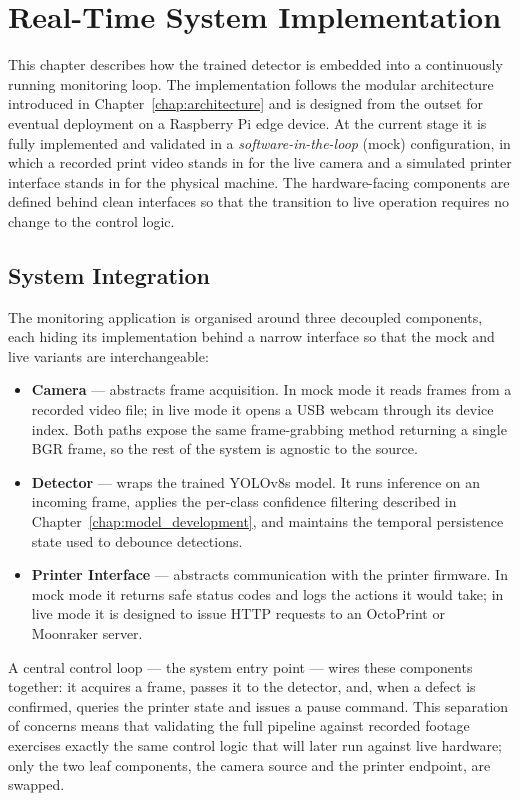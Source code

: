 \documentclass[english, Lau, oneside]{sapthesis}
\begin{document}
\chapter{Real-Time System Implementation}
\label{chap:implementation}

This chapter describes how the trained detector is embedded into a continuously running monitoring loop. The implementation follows the modular architecture introduced in Chapter~\ref{chap:architecture} and is designed from the outset for eventual deployment on a Raspberry Pi edge device. At the current stage it is fully implemented and validated in a \textit{software-in-the-loop} (mock) configuration, in which a recorded print video stands in for the live camera and a simulated printer interface stands in for the physical machine. The hardware-facing components are defined behind clean interfaces so that the transition to live operation requires no change to the control logic.

\section{System Integration}
The monitoring application is organised around three decoupled components, each hiding its implementation behind a narrow interface so that the mock and live variants are interchangeable:

\begin{itemize}
    \item \textbf{Camera} --- abstracts frame acquisition. In mock mode it reads frames from a recorded video file; in live mode it opens a USB webcam through its device index. Both paths expose the same frame-grabbing method returning a single BGR frame, so the rest of the system is agnostic to the source.
    \item \textbf{Detector} --- wraps the trained YOLOv8s model. It runs inference on an incoming frame, applies the per-class confidence filtering described in Chapter~\ref{chap:model_development}, and maintains the temporal persistence state used to debounce detections.
    \item \textbf{Printer Interface} --- abstracts communication with the printer firmware. In mock mode it returns safe status codes and logs the actions it would take; in live mode it is designed to issue HTTP requests to an OctoPrint or Moonraker server.
\end{itemize}

A central control loop --- the system entry point --- wires these components together: it acquires a frame, passes it to the detector, and, when a defect is confirmed, queries the printer state and issues a pause command. This separation of concerns means that validating the full pipeline against recorded footage exercises exactly the same control logic that will later run against live hardware; only the two leaf components, the camera source and the printer endpoint, are swapped.
\end{document}
